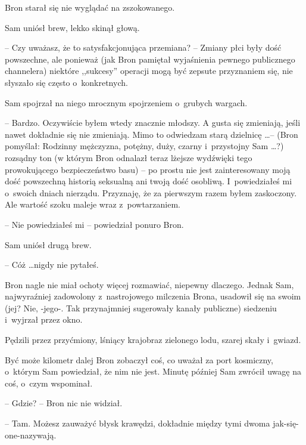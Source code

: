 \documentclass[oneside,polish,11pt,rmheadings]{mwbk}
\begin{document}
Bron starał się nie wyglądać na zszokowanego. 

Sam uniósł brew, lekko skinął głową. 

-- Czy uważasz, że to satysfakcjonująca przemiana? -- Zmiany płci były dość powszechne, ale ponieważ (jak Bron pamiętał wyjaśnienia pewnego publicznego channelera) niektóre ,,sukcesy'' operacji mogą być zepsute przyznaniem się, nie słyszało się często o~konkretnych. 

Sam spojrzał na niego mrocznym spojrzeniem o~grubych wargach. 

-- Bardzo. Oczywiście byłem wtedy znacznie młodszy. A gusta się zmieniają, jeśli nawet dokładnie się nie zmieniają. Mimo to odwiedzam starą dzielnicę \ldots  -- (Bron pomyślał: Rodzinny mężczyzna, potężny, duży, czarny i~przystojny Sam \ldots ?) rozsądny ton (w którym Bron odnalazł teraz lżejsze wydźwięki tego prowokującego bezpieczeństwo basu) -- po prostu nie jest zainteresowany moją dość powszechną historią seksualną ani twoją dość osobliwą. I~powiedziałeś mi o~swoich dniach nierządu. Przyznaję, że za pierwszym razem byłem zaskoczony. Ale wartość szoku maleje wraz z~powtarzaniem. 

-- Nie powiedziałeś mi -- powiedział ponuro Bron. 

Sam uniósł drugą brew. 

-- Cóż \ldots  nigdy nie pytałeś. 

Bron nagle nie miał ochoty więcej rozmawiać, niepewny dlaczego. Jednak Sam, najwyraźniej zadowolony z~nastrojowego milczenia Brona, usadowił się na swoim (jej? Nie, -jego-. Tak przynajmniej sugerowały kanały publiczne) siedzeniu i~wyjrzał przez okno. 

Pędzili przez przyćmiony, lśniący krajobraz zielonego lodu, szarej skały i~gwiazd. 

Być może kilometr dalej Bron zobaczył coś, co uważał za port kosmiczny, o~którym Sam powiedział, że nim nie jest. Minutę później Sam zwrócił uwagę na coś, o~czym wspominał. 

-- Gdzie? -- Bron nic nie widział. 

-- Tam. Możesz zauważyć błysk krawędzi, dokładnie między tymi dwoma jak-się-one-nazywają. 
\end{document}
